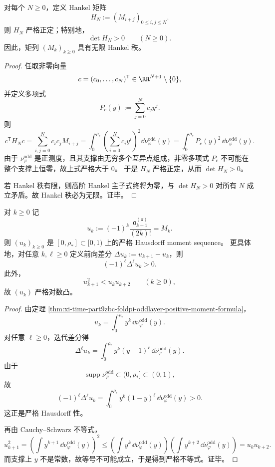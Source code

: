 \begin{theorem}\label{thm:xi-time-part9zbc-foldpi-hankel-strict-positivity}
对每个 \(N\ge 0\)，定义 Hankel 矩阵
\[
H_N:=(M_{i+j})_{0\le i,j\le N}.
\]
则 \(H_N\) 严格正定；特别地，
\[
\det H_N>0
\qquad (N\ge 0).
\]
因此，矩列 \((M_k)_{k\ge 0}\) 具有无限 Hankel 秩。
\end{theorem}
\begin{proof}
任取非零向量
\[
c=(c_0,\dots,c_N)^{\mathsf T}\in\RR^{N+1}\setminus\{0\},
\]
并定义多项式
\[
P_c(y):=\sum_{j=0}^{N}c_jy^j.
\]
则
\[
c^{\mathsf T}H_Nc
=
\sum_{i,j=0}^{N}c_ic_jM_{i+j}
=
\int_{0}^{\rho_\ast}
\left(\sum_{i=0}^{N}c_iy^i\right)^2
\dd\nu_{\varphi}^{\mathrm{odd}}(y)
=
\int_{0}^{\rho_\ast}P_c(y)^2\,\dd\nu_{\varphi}^{\mathrm{odd}}(y).
\]
由于 \(\nu_{\varphi}^{\mathrm{odd}}\) 是正测度，且其支撑由无穷多个互异点组成，非零多项式 \(P_c\) 不可能在整个支撑上恒零，故上式严格大于 \(0\)。
于是 \(H_N\) 严格正定，从而 \(\det H_N>0\)。

若 Hankel 秩有限，则高阶 Hankel 主子式终将为零，与 \(\det H_N>0\) 对所有 \(N\) 成立矛盾。故 Hankel 秩必为无限。证毕。
\end{proof}

\begin{corollary}\label{cor:xi-time-part9zbc-foldpi-strict-hausdorff-logconvex}
对 \(k\ge 0\) 记
\[
u_k:=(-1)^k\frac{\mathfrak a_{k+1}^{(\pi)}}{(2k)!}=M_k.
\]
则 \((u_k)_{k\ge 0}\) 是 \([0,\rho_\ast]\subset[0,1)\) 上的严格 Hausdorff moment sequence。
更具体地，对任意 \(k,\ell\ge 0\) 定义前向差分 \(\Delta u_k:=u_{k+1}-u_k\)，则
\[
(-1)^\ell\Delta^\ell u_k>0.
\]
此外，
\[
u_{k+1}^2<u_ku_{k+2}
\qquad (k\ge 0),
\]
故 \((u_k)\) 严格对数凸。
\end{corollary}
\begin{proof}
由定理 \ref{thm:xi-time-part9zbc-foldpi-oddlayer-positive-moment-formula}，
\[
u_k=\int_0^{\rho_\ast}y^k\,\dd\nu_{\varphi}^{\mathrm{odd}}(y).
\]
对任意 \(\ell\ge 0\)，迭代差分得
\[
\Delta^\ell u_k
=
\int_0^{\rho_\ast}y^k(y-1)^\ell\,\dd\nu_{\varphi}^{\mathrm{odd}}(y).
\]
由于
\[
\operatorname{supp}\nu_{\varphi}^{\mathrm{odd}}\subset(0,\rho_\ast]\subset(0,1),
\]
故
\[
(-1)^\ell\Delta^\ell u_k
=
\int_0^{\rho_\ast}y^k(1-y)^\ell\,\dd\nu_{\varphi}^{\mathrm{odd}}(y)>0.
\]
这正是严格 Hausdorff 性。

再由 Cauchy--Schwarz 不等式，
\[
u_{k+1}^2
=
\left(\int y^{k+1}\,\dd\nu_{\varphi}^{\mathrm{odd}}(y)\right)^2
\le
\left(\int y^k\,\dd\nu_{\varphi}^{\mathrm{odd}}(y)\right)
\left(\int y^{k+2}\,\dd\nu_{\varphi}^{\mathrm{odd}}(y)\right)
=
u_ku_{k+2}.
\]
而支撑上 \(y\) 不是常数，故等号不可能成立，于是得到严格不等式。证毕。
\end{proof}

